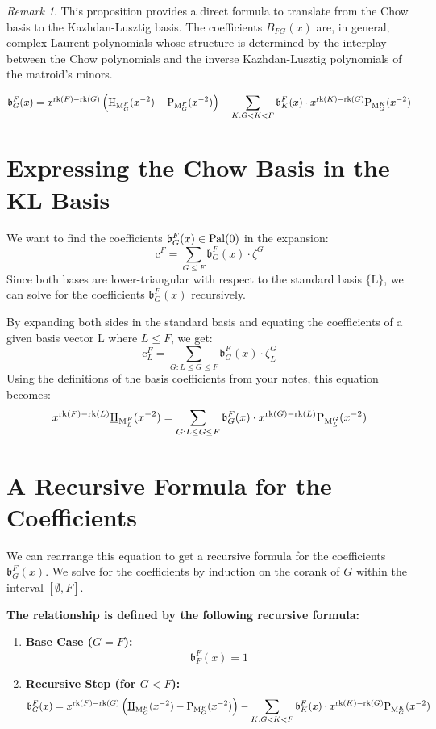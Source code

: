 \documentclass[11pt]{article}
\newcommand{\chow}{\normalfont\text{\underline{H}}}
\newcommand{\klpoly}{\normalfont\text{P}}
\newcommand{\rank}{\normalfont\text{rk}}
\newcommand{\M}{\normalfont\text{M}}
\newcommand{\Ebasis}[1]{\mathrm{#1}}
\newcommand{\Cbasis}[1]{\mathrm{c}^{#1}}
\newcommand{\CbasisSub}[2]{\mathrm{c}^{#1}_{#2}}
\newcommand{\Zbasis}[1]{\zeta^{#1}}
\newcommand{\ZbasisSub}[2]{\zeta^{#1}_{#2}}
\newcommand{\Ibasis}[2]{\mathfrak{b}^{#1}_{#2}}
\newcommand{\pal}{\normalfont\text{Pal}}
\theoremstyle{remark}
\newtheorem*{remark}{Remark} %
\begin{document}
\begin{remark}
    This proposition provides a direct formula to translate from the Chow basis to the Kazhdan-Lusztig basis. The coefficients \(B_{FG}(x)\) are, in general, complex Laurent polynomials whose structure is determined by the interplay between the Chow polynomials and the inverse Kazhdan-Lusztig polynomials of the matroid's minors.
\end{remark}
\begin{equation}\label{eq:incidence_algebra_convolution}
    \Ibasis{F}{G}(x) = x^{\rank(F)-\rank(G)}\left(\chow_{\M_G^F}(x^{-2}) - \klpoly_{\M_G^F}(x^{-2})\right) - \sum_{K: G < K < F} \Ibasis{F}{K}(x) \cdot x^{\rank(K)-\rank(G)}\klpoly_{\M_G^K}(x^{-2})
\end{equation}

\section*{Expressing the Chow Basis in the KL Basis}

We want to find the coefficients $\Ibasis{F}{G}(x) \in \pal(0)$ in the expansion:
\[
    \Cbasis{F} = \sum_{G \le F} \Ibasis{F}{G}(x) \cdot \Zbasis{G}
\]
Since both bases are lower-triangular with respect to the standard basis $\{\Ebasis{L}\}$, we can solve for the coefficients $\Ibasis{F}{G}(x)$ recursively.

By expanding both sides in the standard basis and equating the coefficients of a given basis vector $\Ebasis{L}$ where $L \le F$, we get:
\[
    \CbasisSub{F}{L} = \sum_{G: L \le G \le F} \Ibasis{F}{G}(x) \cdot \ZbasisSub{G}{L}
\]
Using the definitions of the basis coefficients from your notes, this equation becomes:
\[
    x^{\rank(F)-\rank(L)} \chow_{\M_L^F}(x^{-2}) = \sum_{G: L \le G \le F} \Ibasis{F}{G}(x) \cdot x^{\rank(G)-\rank(L)} \klpoly_{\M_L^G}(x^{-2})
\]

\section*{A Recursive Formula for the Coefficients}

We can rearrange this equation to get a recursive formula for the coefficients $\Ibasis{F}{G}(x)$. We solve for the coefficients by induction on the corank of $G$ within the interval $[\emptyset, F]$.

\begin{tcolorbox}
\textbf{The relationship is defined by the following recursive formula:}
\begin{enumerate}
    \item \textbf{Base Case ($G=F$):}
    \[ \Ibasis{F}{F}(x) = 1 \]

    \item \textbf{Recursive Step (for $G < F$):}
    \[ 
        \Ibasis{F}{G}(x) = x^{\rank(F)-\rank(G)}\left(\chow_{\M_G^F}(x^{-2}) - \klpoly_{\M_G^F}(x^{-2})\right) - \sum_{K: G < K < F} \Ibasis{F}{K}(x) \cdot x^{\rank(K)-\rank(G)}\klpoly_{\M_G^K}(x^{-2})
    \]
\end{enumerate}
\end{tcolorbox}
\end{document}
